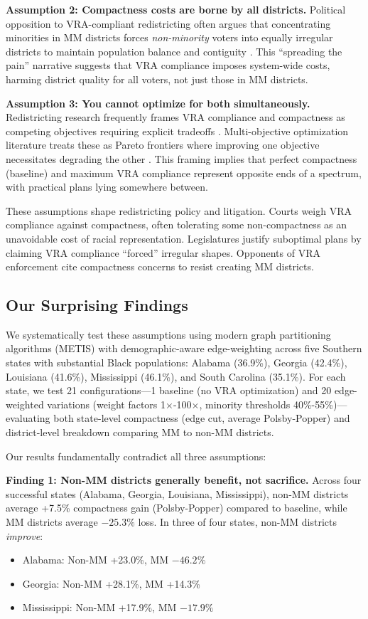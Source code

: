 \textbf{Assumption 2: Compactness costs are borne by all districts.} Political opposition to VRA-compliant redistricting often argues that concentrating minorities in MM districts forces \emph{non-minority} voters into equally irregular districts to maintain population balance and contiguity \citep{issacharoff2002}. This ``spreading the pain'' narrative suggests that VRA compliance imposes system-wide costs, harming district quality for all voters, not just those in MM districts.

\textbf{Assumption 3: You cannot optimize for both simultaneously.} Redistricting research frequently frames VRA compliance and compactness as competing objectives requiring explicit tradeoffs \citep{ricca2013}. Multi-objective optimization literature treats these as Pareto frontiers where improving one objective necessitates degrading the other \citep{mehrotra1998}. This framing implies that perfect compactness (baseline) and maximum VRA compliance represent opposite ends of a spectrum, with practical plans lying somewhere between.

These assumptions shape redistricting policy and litigation. Courts weigh VRA compliance against compactness, often tolerating some non-compactness as an unavoidable cost of racial representation. Legislatures justify suboptimal plans by claiming VRA compliance ``forced'' irregular shapes. Opponents of VRA enforcement cite compactness concerns to resist creating MM districts.

\subsection{Our Surprising Findings}

We systematically test these assumptions using modern graph partitioning algorithms (METIS) with demographic-aware edge-weighting across five Southern states with substantial Black populations: Alabama (36.9\%), Georgia (42.4\%), Louisiana (41.6\%), Mississippi (46.1\%), and South Carolina (35.1\%). For each state, we test 21 configurations---1 baseline (no VRA optimization) and 20 edge-weighted variations (weight factors 1$\times$-100$\times$, minority thresholds 40\%-55\%)---evaluating both state-level compactness (edge cut, average Polsby-Popper) and district-level breakdown comparing MM to non-MM districts.

Our results fundamentally contradict all three assumptions:

\textbf{Finding 1: Non-MM districts generally benefit, not sacrifice.} Across four successful states (Alabama, Georgia, Louisiana, Mississippi), non-MM districts average +7.5\% compactness gain (Polsby-Popper) compared to baseline, while MM districts average $-25.3\%$ loss. In three of four states, non-MM districts \emph{improve}:
\begin{itemize}
    \item Alabama: Non-MM +23.0\%, MM $-46.2\%$
    \item Georgia: Non-MM +28.1\%, MM +14.3\%
    \item Mississippi: Non-MM +17.9\%, MM $-17.9\%$
\end{itemize}

